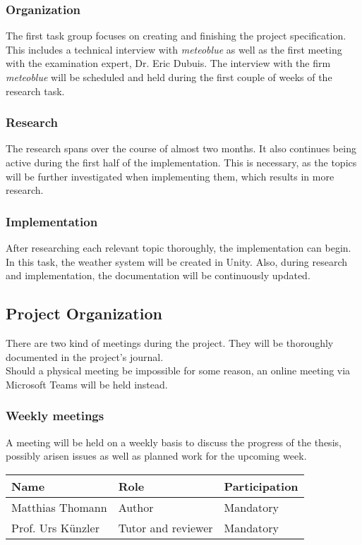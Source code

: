 
\clearpage
\subsubsection{Organization}
The first task group focuses on creating and finishing the project specification. This includes a technical interview with \emph{meteoblue} as well as the first meeting with the examination expert, Dr. Eric Dubuis.
The interview with the firm \emph{meteoblue} will be scheduled and held during the first couple of weeks of the research task.

\subsubsection{Research}
The research spans over the course of almost two months. It also continues being active during the first half of the implementation. This is necessary, as the topics will be further investigated when implementing them, which results in more research.

\subsubsection{Implementation}
After researching each relevant topic thoroughly, the implementation can begin. In this task, the weather system will be created in Unity.
Also, during research and implementation, the documentation will be continuously updated.

\subsection{Project Organization}
There are two kind of meetings during the project. They will be thoroughly documented in the project's journal.
\\
Should a physical meeting be impossible for some reason, an online meeting via Microsoft Teams will be held instead.

\subsubsection{Weekly meetings}
A meeting will be held on a weekly basis to discuss the progress of the thesis, possibly arisen issues as well as planned work for the upcoming week.
\emptyline
\noindent\begin{tabular}{|l|l|l|}
    \hline
    \textbf{Name}       & \textbf{Role}         & \textbf{Participation}\\ \hline
    Matthias Thomann    & Author                & Mandatory             \\ \hline
    Prof. Urs Künzler   & Tutor and reviewer    & Mandatory             \\ \hline
\end{tabular}

